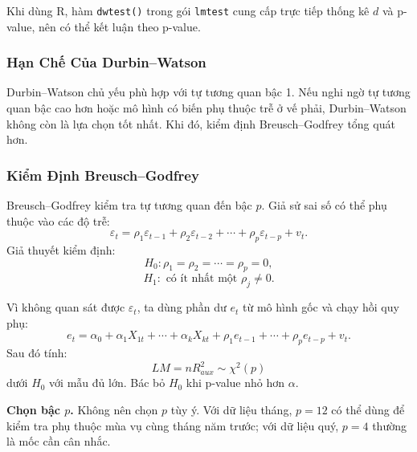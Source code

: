 Khi dùng R, hàm \texttt{dwtest()} trong gói \texttt{lmtest} cung cấp trực tiếp thống kê $d$ và p-value, nên có thể kết luận theo p-value.

\subsubsection{Hạn Chế Của Durbin--Watson}

Durbin--Watson chủ yếu phù hợp với tự tương quan bậc 1. Nếu nghi ngờ tự tương quan bậc cao hơn hoặc mô hình có biến phụ thuộc trễ ở vế phải, Durbin--Watson không còn là lựa chọn tốt nhất. Khi đó, kiểm định Breusch--Godfrey tổng quát hơn.

\subsubsection{Kiểm Định Breusch--Godfrey}

Breusch--Godfrey kiểm tra tự tương quan đến bậc $p$. Giả sử sai số có thể phụ thuộc vào các độ trễ:
\[
  \varepsilon_t
  =
  \rho_1\varepsilon_{t-1}
  + \rho_2\varepsilon_{t-2}
  + \cdots
  + \rho_p\varepsilon_{t-p}
  + v_t.
\]
Giả thuyết kiểm định:
\[
  H_0:\rho_1=\rho_2=\cdots=\rho_p=0,
\]
\[
  H_1:\text{ có ít nhất một }\rho_j\neq 0.
\]

Vì không quan sát được $\varepsilon_t$, ta dùng phần dư $e_t$ từ mô hình gốc và chạy hồi quy phụ:
\[
  e_t
  =
  \alpha_0
  + \alpha_1X_{1t}
  + \cdots
  + \alpha_kX_{kt}
  + \rho_1e_{t-1}
  + \cdots
  + \rho_pe_{t-p}
  + v_t.
\]
Sau đó tính:
\[
  LM = nR^2_{aux} \sim \chi^2(p)
\]
dưới $H_0$ với mẫu đủ lớn. Bác bỏ $H_0$ khi p-value nhỏ hơn $\alpha$.

\textbf{Chọn bậc $p$.} Không nên chọn $p$ tùy ý. Với dữ liệu tháng, $p=12$ có thể dùng để kiểm tra phụ thuộc mùa vụ cùng tháng năm trước; với dữ liệu quý, $p=4$ thường là mốc cần cân nhắc.

